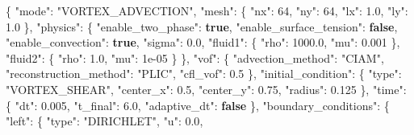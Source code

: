 \documentclass[
  10pt,
]{article}
\newenvironment{Shaded}{}{}
\newcommand{\DataTypeTok}[1]{\textcolor[rgb]{0.56,0.13,0.00}{#1}}
\newcommand{\DecValTok}[1]{\textcolor[rgb]{0.25,0.63,0.44}{#1}}
\newcommand{\FloatTok}[1]{\textcolor[rgb]{0.25,0.63,0.44}{#1}}
\newcommand{\FunctionTok}[1]{\textcolor[rgb]{0.02,0.16,0.49}{#1}}
\newcommand{\KeywordTok}[1]{\textcolor[rgb]{0.00,0.44,0.13}{\textbf{#1}}}
\newcommand{\StringTok}[1]{\textcolor[rgb]{0.25,0.44,0.63}{#1}}
\begin{document}
\begin{Shaded}
\begin{Highlighting}[]
\FunctionTok{\{}
  \DataTypeTok{"mode"}\FunctionTok{:} \StringTok{"VORTEX\_ADVECTION"}\FunctionTok{,}
  \DataTypeTok{"mesh"}\FunctionTok{:} \FunctionTok{\{}
    \DataTypeTok{"nx"}\FunctionTok{:} \DecValTok{64}\FunctionTok{,}
    \DataTypeTok{"ny"}\FunctionTok{:} \DecValTok{64}\FunctionTok{,}
    \DataTypeTok{"lx"}\FunctionTok{:} \FloatTok{1.0}\FunctionTok{,}
    \DataTypeTok{"ly"}\FunctionTok{:} \FloatTok{1.0}
  \FunctionTok{\},}
  \DataTypeTok{"physics"}\FunctionTok{:} \FunctionTok{\{}
    \DataTypeTok{"enable\_two\_phase"}\FunctionTok{:} \KeywordTok{true}\FunctionTok{,}
    \DataTypeTok{"enable\_surface\_tension"}\FunctionTok{:} \KeywordTok{false}\FunctionTok{,}
    \DataTypeTok{"enable\_convection"}\FunctionTok{:} \KeywordTok{true}\FunctionTok{,}
    \DataTypeTok{"sigma"}\FunctionTok{:} \FloatTok{0.0}\FunctionTok{,}
    \DataTypeTok{"fluid1"}\FunctionTok{:} \FunctionTok{\{}
      \DataTypeTok{"rho"}\FunctionTok{:} \FloatTok{1000.0}\FunctionTok{,}
      \DataTypeTok{"mu"}\FunctionTok{:} \FloatTok{0.001}
    \FunctionTok{\},}
    \DataTypeTok{"fluid2"}\FunctionTok{:} \FunctionTok{\{}
      \DataTypeTok{"rho"}\FunctionTok{:} \FloatTok{1.0}\FunctionTok{,}
      \DataTypeTok{"mu"}\FunctionTok{:} \DecValTok{1e{-}05}
    \FunctionTok{\}}
  \FunctionTok{\},}
  \DataTypeTok{"vof"}\FunctionTok{:} \FunctionTok{\{}
    \DataTypeTok{"advection\_method"}\FunctionTok{:} \StringTok{"CIAM"}\FunctionTok{,}
    \DataTypeTok{"reconstruction\_method"}\FunctionTok{:} \StringTok{"PLIC"}\FunctionTok{,}
    \DataTypeTok{"cfl\_vof"}\FunctionTok{:} \FloatTok{0.5}
  \FunctionTok{\},}
  \DataTypeTok{"initial\_condition"}\FunctionTok{:} \FunctionTok{\{}
    \DataTypeTok{"type"}\FunctionTok{:} \StringTok{"VORTEX\_SHEAR"}\FunctionTok{,}
    \DataTypeTok{"center\_x"}\FunctionTok{:} \FloatTok{0.5}\FunctionTok{,}
    \DataTypeTok{"center\_y"}\FunctionTok{:} \FloatTok{0.75}\FunctionTok{,}
    \DataTypeTok{"radius"}\FunctionTok{:} \FloatTok{0.125}
  \FunctionTok{\},}
  \DataTypeTok{"time"}\FunctionTok{:} \FunctionTok{\{}
    \DataTypeTok{"dt"}\FunctionTok{:} \FloatTok{0.005}\FunctionTok{,}
    \DataTypeTok{"t\_final"}\FunctionTok{:} \FloatTok{6.0}\FunctionTok{,}
    \DataTypeTok{"adaptive\_dt"}\FunctionTok{:} \KeywordTok{false}
  \FunctionTok{\},}
  \DataTypeTok{"boundary\_conditions"}\FunctionTok{:} \FunctionTok{\{}
    \DataTypeTok{"left"}\FunctionTok{:} \FunctionTok{\{}
      \DataTypeTok{"type"}\FunctionTok{:} \StringTok{"DIRICHLET"}\FunctionTok{,}
      \DataTypeTok{"u"}\FunctionTok{:} \FloatTok{0.0}\FunctionTok{,}

\end{Highlighting}
\end{Shaded}
\end{document}
